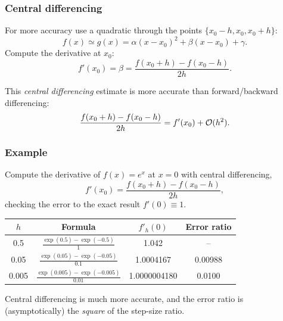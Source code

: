 \documentclass{beamer}
\begin{document}
\begin{frame}
  \frametitle{Central differencing}

  For more accuracy use a quadratic through the points $\{x_0 - h,
  x_0, x_0 + h\}$:
  \begin{equation*}
    f(x) \simeq g(x) = \alpha (x - x_0)^2 + \beta (x - x_0) + \gamma.
  \end{equation*}
  Compute the derivative at $x_0$:
  \begin{equation*}
    f'(x_0) = \beta = \frac{f(x_0 + h) - f(x_0 - h)}{2 h}.
  \end{equation*} \pause

  \vspace{1ex}

  This \emph{central differencing} estimate is more accurate than
  forward/backward differencing:
  \begin{equation*}
    \frac{f(x_0 + h) - f(x_0 - h)}{2 h} = f'(x_0) + {\cal O}(h^2).
  \end{equation*}

\end{frame}

\begin{frame}
  \frametitle{Example}

  Compute the derivative of $f(x) = e^{x}$ at $x=0$ with central
  differencing,
  \begin{equation*}
    f'(x_0) = \frac{f(x_0 + h) - f(x_0 - h)}{2 h},
  \end{equation*}
  checking the error to the exact result $f'(0) \equiv 1$.
  \begin{center}
    \begin{tabular}{c|c c c}
      $h$ & Formula & $f'_h(0)$  & Error ratio \\ \hline
      0.5 & \rule{0pt}{1.5em} $\frac{\exp(0.5) - \exp(-0.5)}{1}$ & 1.042  & -- \\
      0.05 & \rule{0pt}{1.5em} $\frac{\exp(0.05) - \exp(-0.05)}{0.1}$ & 1.0004167 &
      0.00988 \\
      0.005 & \rule{0pt}{1.5em} $\frac{\exp(0.005) - \exp(-0.005)}{0.01}$ & 1.0000004180
      & 0.0100
    \end{tabular}
  \end{center}
  Central differencing is much more accurate, and the error ratio is
  (asymptotically) the \emph{square} of the step-size ratio.

\end{frame}
\end{document}
